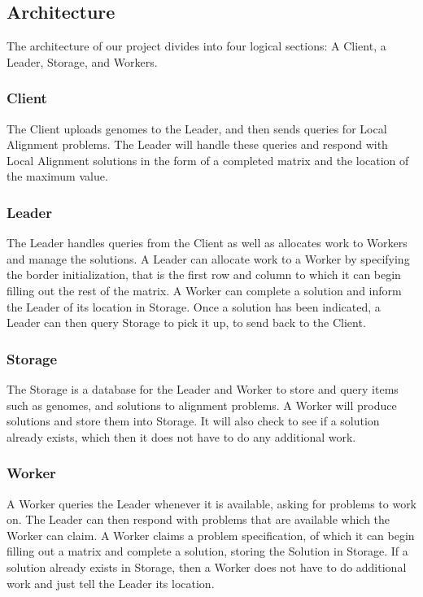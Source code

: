 \documentclass[11pt]{article}
\begin{document}
\subsection{Architecture}
The architecture of our project divides into four logical sections: A Client, a Leader, Storage, and Workers.

\subsubsection{Client}
The Client uploads genomes to the Leader, and then sends queries for Local Alignment problems. The Leader will handle these queries and respond with Local Alignment solutions in the form of a completed matrix and the location of the maximum value.

\subsubsection{Leader}
The Leader handles queries from the Client as well as allocates work to Workers and manage the solutions. A Leader can allocate work to a Worker by specifying the border initialization, that is the first row and column to which it can begin filling out the rest of the matrix. A Worker can complete a solution and inform the Leader of its location in Storage. Once a solution has been indicated, a Leader can then query Storage to pick it up, to send back to the Client. 

\subsubsection{Storage}
The Storage is a database for the Leader and Worker to store and query items such as genomes, and solutions to alignment problems. 
A Worker will produce solutions and store them into Storage. It will also check to see if a solution already exists, which then it does not have to do any additional work.

\subsubsection{Worker}
A Worker queries the Leader whenever it is available, asking for problems to work on. The Leader can then respond with problems that are available which the Worker can claim. A Worker claims a problem specification, of which it can begin filling out a matrix and complete a solution, storing the Solution in Storage.
If a solution already exists in Storage, then a Worker does not have to do additional work and just tell the Leader its location.
\end{document}
